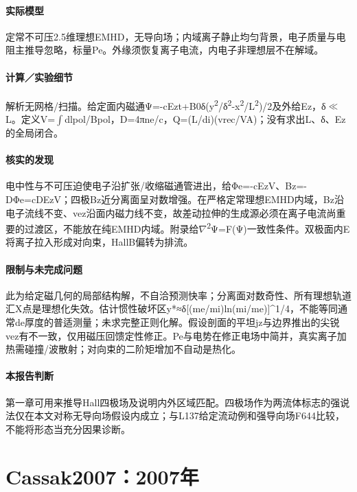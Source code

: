 \paragraph{实际模型}定常不可压2.5维理想EMHD，无导向场；内域离子静止均匀背景，电子质量与电阻主推导忽略，标量Pe。外缘须恢复离子电流，内电子非理想层不在解域。

\paragraph{计算／实验细节}解析无网格/扫描。给定面内磁通Ψ=-cEzt+B0δ(y\textsuperscript{2}/δ\textsuperscript{2}-x\textsuperscript{2}/L\textsuperscript{2})/2及外给Ez，δ\ensuremath{\ll}L。定义V=\ensuremath{\int}dlpol/Bpol，D=4πne/c，Q=(L/di)(vrec/VA)；没有求出L、δ、Ez的全局闭合。

\paragraph{核实的发现}电中性与不可压迫使电子沿扩张/收缩磁通管进出，给Φe=-cEzV、Bz=-DΦe=cDEzV；四极Bz近分离面呈对数增强。在严格定常理想EMHD内域，Bz沿电子流线不变、vez沿面内磁力线不变，故差动拉伸的生成源必须在离子电流尚重要的过渡区，不能放在纯EMHD内域。附录给\ensuremath{\nabla}\textsuperscript{2}Ψ=F(Ψ)一致性条件。双极面内E将离子拉入形成对向束，HallB偏转为排流。

\paragraph{限制与未完成问题}此为给定磁几何的局部结构解，不自洽预测快率；分离面对数奇性、所有理想轨道汇X点是理想化失效。估计惯性破坏区y*≈δ[(me/mi)ln(mi/me)]\textasciicircum{}1/4，不能等同通常de厚度的普适测量；未求完整正则化解。假设剖面的平坦jz与边界推出的尖锐vez有不一致，仅用磁压回馈定性修正。Pe与电势在修正电场中简并，真实离子加热需碰撞/波散射；对向束的二阶矩增加不自动是热化。

\paragraph{本报告判断}第一章可用来推导Hall四极场及说明内外区域匹配。四极场作为两流体标志的强说法仅在本文对称无导向场假设内成立；与L137给定流动例和强导向场F644比较，不能将形态当充分因果诊断。

\section{Cassak2007：2007年}\label{paper:Cassak2007}

